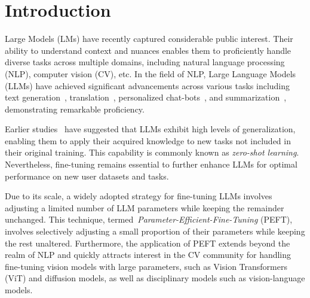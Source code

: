 \section{Introduction}
\label{sec:introduction}


Large Models (LMs) have recently captured considerable public interest. Their ability to understand context and nuances enables them to proficiently handle diverse tasks across multiple domains, including natural language processing (NLP), computer vision (CV), etc. In the field of NLP, Large Language Models (LLMs) have achieved significant advancements across various tasks including text generation~\cite{brown2020language,45-llm-qa}, translation~\cite{zhu2023multilingual,46-language-translation}, personalized chat-bots~\cite{gentopia,li2023camel,wu2023autogen}, and summarization~\cite{zhang2023summit}, demonstrating remarkable proficiency.


Earlier studies~\cite{brown2020language} have suggested that LLMs exhibit high levels of generalization, enabling them to apply their acquired knowledge to new tasks not included in their original training. This capability is commonly known as \textit{zero-shot learning}. Nevertheless, fine-tuning remains essential to further enhance LLMs for optimal performance on new user datasets and tasks.
 

Due to its scale, a widely adopted strategy for fine-tuning LLMs involves adjusting a limited number of LLM parameters while keeping the remainder unchanged. This technique, termed~\textit{Parameter-Efficient-Fine-Tuning} (PEFT), involves selectively adjusting a small proportion of their parameters while keeping the rest unaltered. 
Furthermore, the application of PEFT extends beyond the realm of NLP and quickly attracts interest in the CV community for handling fine-tuning vision models with large parameters, such as Vision Transformers (ViT) and diffusion models, as well as disciplinary models such as vision-language models.



